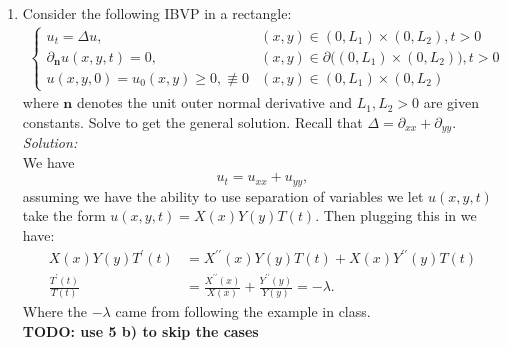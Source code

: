 \documentclass[10pt]{amsart}
\theoremstyle{nonumberplain}
\begin{document}
\begin{enumerate}[label={\bf {\arabic*}:}]
\item Consider the following IBVP in a rectangle: \\
\begin{align*}
\begin{cases}
u_t = \Delta u, &(x, y) \in (0, L_1) \times (0, L_2), t > 0 \\
\partial_{\bm n} u(x, y, t) = 0, &(x, y) \in \partial \big( (0, L_1) \times (0, L_2) \big), t > 0 \\
u(x, y, 0) = u_0(x, y) \geq 0, \not \equiv 0 &(x, y) \in (0, L_1) \times (0, L_2)
\end{cases}
\end{align*}
where $\bm n$ denotes the unit outer normal derivative and $L_1, L_2 > 0$ are given constants.
Solve to get the general solution.
Recall that $\Delta = \partial_{xx} + \partial_{yy}$. \\
\textit{Solution:} \\
We have
$$
u_t = u_{xx} + u_{yy},
$$
assuming we have the ability to use separation of variables we let $u(x, y, t)$ take the form
$u(x, y, t) = X(x)Y(y)T(t)$.
Then plugging this in we have:
\begin{align*}
X(x)Y(y)T^\prime(t) &= X^{\prime\prime}(x)Y(y)T(t) + X(x)Y^{\prime\prime}(y)T(t) \\
\frac {T^\prime(t)}{T(t)} &= \frac{X^{\prime\prime}(x)}{X(x)} + \frac{Y^{\prime\prime}(y)}{Y(y)} = -\lambda.
\end{align*}
Where the $-\lambda$ came from following the example in class. \\
\textbf{TODO: use 5 b) to skip the cases}

\end{enumerate}
\end{document}
